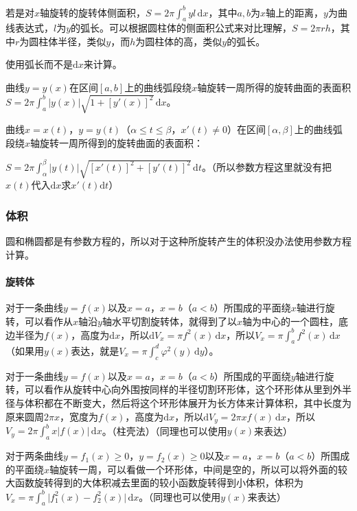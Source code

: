 \documentclass[UTF8, 12pt]{ctexart}
\begin{document}
        若是对$x$轴旋转的旋转体侧面积，$S=2\pi\int_a^byl\,\textrm{d}x$，其中$a,b$为$x$轴上的距离，$y$为曲线表达式，$l$为$y$的弧长。可以根据圆柱体的侧面积公式来对比理解，$S=2\pi rh$，其中$r$为圆柱体半径，类似$y$，而$h$为圆柱体的高，类似$y$的弧长。

        使用弧长而不是$\textrm{d}x$来计算。

        曲线$y=y(x)$在区间$[a,b]$上的曲线弧段绕$x$轴旋转一周所得的旋转曲面的表面积$S=2\pi\int_a^b\vert y(x)\vert\sqrt{1+[y'(x)]^2}\,\textrm{d}x$。

        曲线$x=x(t)$，$y=y(t)$（$\alpha\leqslant t\leqslant\beta$，$x'(t)\neq0$）在区间$[\alpha,\beta]$上的曲线弧段绕$x$轴旋转一周所得到的旋转曲面的表面积：

        $S=2\pi\int_\alpha^\beta\vert y(t)\vert\sqrt{[x'(t)]^2+[y'(t)]^2}\,\textrm{d}t$。（所以参数方程这里就没有把$x(t)$代入$\textrm{d}x$求$x'(t)\textrm{d}t$）

        \subsubsection{体积}

        圆和椭圆都是有参数方程的，所以对于这种所旋转产生的体积没办法使用参数方程计算。

        \paragraph{旋转体} \leavevmode \medskip

        对于一条曲线$y=f(x)$以及$x=a$，$x=b$（$a<b$）所围成的平面绕$x$轴进行旋转，可以看作从$x$轴沿$y$轴水平切割旋转体，就得到了以$x$轴为中心的一个圆柱，底边半径为$f(x)$，高度为$\textrm{d}x$，所以$\textrm{d}V_x=\pi f^2(x)\,\textrm{d}x$，所以$V_x=\pi\int_a^bf^2(x)\,\textrm{d}x$（如果用$y(x)$表达，就是$V_x=\pi\int_c^d\varphi^2(y)\,\textrm{d}y$）。

        对于一条曲线$y=f(x)$以及$x=a$，$x=b$（$a<b$）所围成的平面绕$y$轴进行旋转，可以看作从旋转中心向外围按同样的半径切割环形体，这个环形体从里到外半径与体积都在不断变大，然后将这个环形体展开为长方体来计算体积，其中长度为原来圆周$2\pi x$，宽度为$f(x)$，高度为$\textrm{d}x$，所以$\textrm{d}V_y=2\pi xf(x)\,\textrm{d}x$，所以$V_y=2\pi\int_a^bx\vert f(x)\vert\,\textrm{d}x$。（柱壳法）（同理也可以使用$y(x)$来表达）

        对于两条曲线$y=f_1(x)\geqslant0$，$y=f_2(x)\geqslant0$以及$x=a$，$x=b$（$a<b$）所围成的平面绕$x$轴旋转一周，可以看做一个环形体，中间是空的，所以可以将外面的较大函数旋转得到的大体积减去里面的较小函数旋转得到小体积，体积为$V_x=\pi\int_a^b\vert f_1^2(x)-f_2^2(x)\vert\,\textrm{d}x$。（同理也可以使用$y(x)$来表达）
\end{document}
